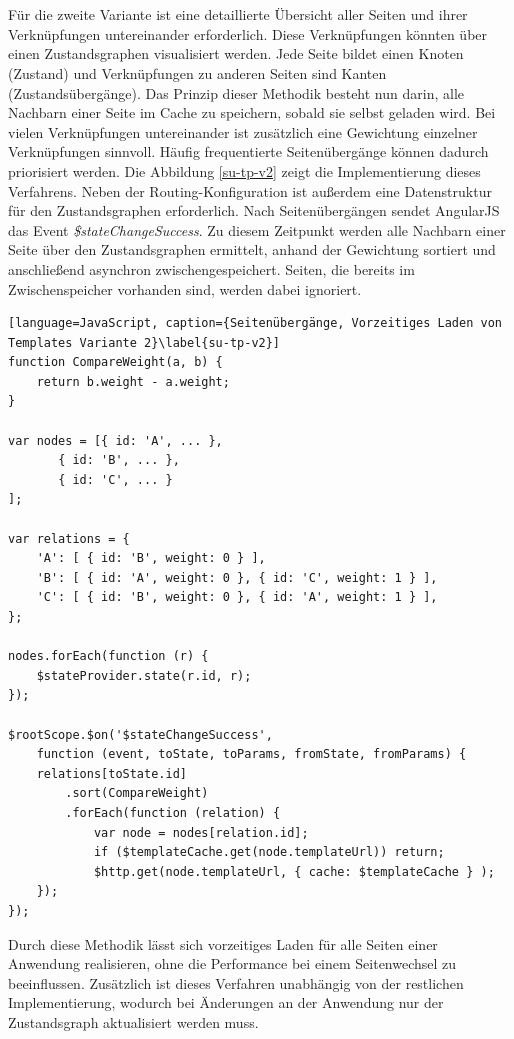 \\\\
Für die zweite Variante ist eine detaillierte Übersicht aller Seiten und ihrer Verknüpfungen untereinander erforderlich. Diese Verknüpfungen könnten über einen Zustandsgraphen visualisiert werden. Jede Seite bildet einen Knoten (Zustand) und Verknüpfungen zu anderen Seiten sind Kanten (Zustandsübergänge). Das Prinzip dieser Methodik besteht nun darin, alle Nachbarn einer Seite im Cache zu speichern, sobald sie selbst geladen wird. Bei vielen Verknüpfungen untereinander ist zusätzlich eine Gewichtung einzelner Verknüpfungen sinnvoll. Häufig frequentierte Seitenübergänge können dadurch priorisiert werden. Die Abbildung \ref{su-tp-v2} zeigt die Implementierung dieses Verfahrens. Neben der Routing-Konfiguration ist außerdem eine Datenstruktur für den Zustandsgraphen erforderlich. Nach Seitenübergängen sendet AngularJS das Event \emph{\$stateChangeSuccess}. Zu diesem Zeitpunkt werden alle Nachbarn einer Seite über den Zustandsgraphen ermittelt, anhand der Gewichtung sortiert und anschließend asynchron zwischengespeichert. Seiten, die bereits im Zwischenspeicher vorhanden sind, werden dabei ignoriert.
\begin{lstlisting}[language=JavaScript, caption={Seitenübergänge, Vorzeitiges Laden von Templates Variante 2}\label{su-tp-v2}]
function CompareWeight(a, b) {
	return b.weight - a.weight;
}

var nodes = [{ id: 'A', ... }, 
       { id: 'B', ... }, 
       { id: 'C', ... }
];

var relations = {
	'A': [ { id: 'B', weight: 0 } ],
	'B': [ { id: 'A', weight: 0 }, { id: 'C', weight: 1 } ],
	'C': [ { id: 'B', weight: 0 }, { id: 'A', weight: 1 } ],
};

nodes.forEach(function (r) {
	$stateProvider.state(r.id, r);
});

$rootScope.$on('$stateChangeSuccess', 
	function (event, toState, toParams, fromState, fromParams) {
	relations[toState.id]
		.sort(CompareWeight)
		.forEach(function (relation) {
			var node = nodes[relation.id];
			if ($templateCache.get(node.templateUrl)) return;
			$http.get(node.templateUrl, { cache: $templateCache } );
	});
});
\end{lstlisting}
Durch diese Methodik lässt sich vorzeitiges Laden für alle Seiten einer Anwendung realisieren, ohne die Performance bei einem Seitenwechsel zu beeinflussen. Zusätzlich ist dieses Verfahren unabhängig von der restlichen Implementierung, wodurch bei Änderungen an der Anwendung nur der Zustandsgraph aktualisiert werden muss. 